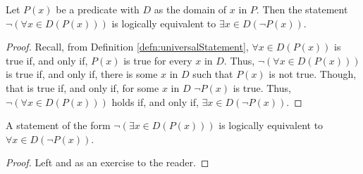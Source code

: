 \guard




\begin{thm}
\label{thm:negationOfQuantifiedStatement}
  Let $P(x)$ be a predicate with $D$ as the domain of $x$ in $P$.
  Then the statement $\neg\left(\forall x\in D(P(x))\right)$ is logically equivalent to $\exists x \in D( \neg P(x) )$.
\end{thm}
\begin{proof}
  Recall, from Definition \ref{defn:universalStatement}, $\forall x\in D(P(x))$ is true if, and only if, $P(x)$ is true for every $x$ in $D$.
  Thus, $\neg\left(\forall x\in D(P(x))\right)$ is true if, and only if, there is some $x$ in $D$ such that $P(x)$ is not true.
  Though, that is true if, and only if, for some $x$ in $D$ $\neg P(x)$ is true.
  Thus, $\neg\left(\forall x\in D(P(x))\right)$ holds if, and only if, $\exists x\in D(\neg P(x))$.
\end{proof}

\begin{cor}
  A statement of the form $\neg\left(\exists x\in D(P(x))\right)$ is logically equivalent to $\forall x\in D (\neg P(x))$.
\end{cor}
\begin{proof}
  Left and as an exercise to the reader.
\end{proof}

